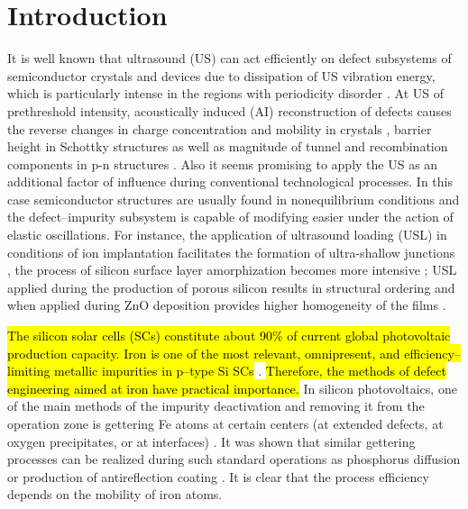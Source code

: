 \documentclass[sn-mathphys]{sn-jnl}%
\theoremstyle{thmstyleone}%
\theoremstyle{thmstyletwo}%
\theoremstyle{thmstylethree}%
\begin{document}



\maketitle

\section{Introduction}\label{sec1}

It is well known that ultrasound (US) can act efficiently on defect subsystems of semiconductor crystals and devices due to dissipation of US vibration energy, which is particularly intense in the regions with periodicity disorder \cite{ostapenko2002,Savkina2013,Olikh2018JAP}.
At US of prethreshold intensity, acoustically induced (AI) reconstruction of defects causes the reverse changes in charge concentration and mobility in crystals \cite{Davletova2008,Olikh2020JEM},
barrier height in Schottky structures \cite{Olikh:Ultras,OlikhJAP}
as well as magnitude of tunnel and recombination components in p-n structures \cite{Teterkin2009,Olikh2018JAP}.
Also it seems promising to apply the US as an additional factor of influence during conventional technological processes.
In this case semiconductor structures are usually found in  nonequilibrium conditions and the defect--impurity subsystem is capable of modifying easier under the action of elastic oscillations.
For instance, the application of ultrasound loading (USL) in conditions of ion implantation facilitates
the formation of ultra-shallow junctions \cite{USImplant:JVacSci},
the process of silicon surface layer amorphization becomes more intensive \cite{RomanyukSST};
USL applied during the production of porous silicon  results in structural ordering \cite{Kalem2000}
and when applied during ZnO deposition provides higher homogeneity of the films \cite{US:ZnOfilm}.

\hl{ The silicon solar cells (SCs) constitute about 90\% of current global photovoltaic production capacity.
Iron is one of the most relevant, omnipresent, and efficiency--limiting metallic impurities
in p--type Si SCs} \cite{Istratov1999,IronSC}.
\hl{ Therefore, the methods of defect engineering aimed at iron have practical importance.}
In silicon photovoltaics, one of the main methods of the impurity deactivation and removing it from the operation zone is gettering Fe atoms at certain centers (at extended defects, at oxygen precipitates, or at interfaces) \cite{LaineIEEEPV2016}.
It was shown that similar gettering processes can be realized during such standard operations as phosphorus diffusion  \cite{FeB:Vahanissi}
or production of antireflection coating  \cite{Teimuraz2014JAP}.
It is clear that the process efficiency depends on the mobility of iron atoms.
\end{document}

